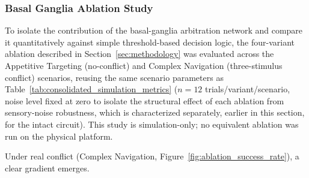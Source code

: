 \FloatBarrier

\subsubsection{Basal Ganglia Ablation Study}

To isolate the contribution of the basal-ganglia arbitration network and compare it quantitatively against simple threshold-based decision logic, the four-variant ablation described in Section~\ref{sec:methodology} was evaluated across the Appetitive Targeting (no-conflict) and Complex Navigation (three-stimulus conflict) scenarios, reusing the same scenario parameters as Table~\ref{tab:consolidated_simulation_metrics} ($n=12$ trials/variant/scenario, noise level fixed at zero to isolate the structural effect of each ablation from sensory-noise robustness, which is characterized separately, earlier in this section, for the intact circuit). This study is simulation-only; no equivalent ablation was run on the physical platform.

 Under real conflict (Complex Navigation, Figure~\ref{fig:ablation_success_rate}), a clear gradient emerges. 

